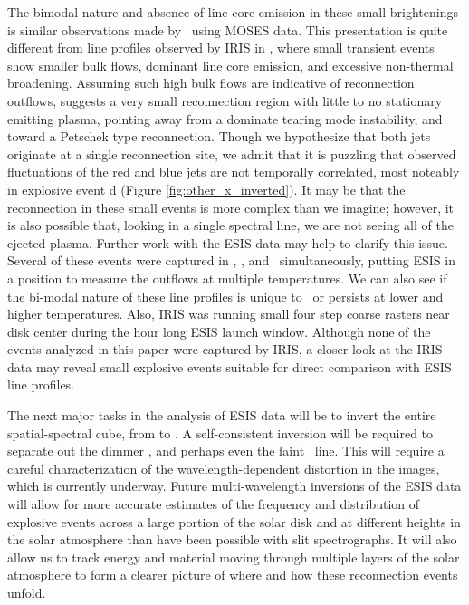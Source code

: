 	The bimodal nature and absence of line core emission in these small brightenings is similar observations made by \citet{Rust2019} \heii \ using MOSES data.
	This presentation is quite different from line profiles observed by IRIS \citep{depontieu2014} in , where small transient events show smaller bulk flows, dominant line core emission, and excessive non-thermal broadening.
	Assuming such high bulk flows are indicative of reconnection outflows, suggests a very small reconnection region with little to no stationary emitting plasma, pointing away from a dominate tearing mode instability, and toward a Petschek type reconnection.
	Though we hypothesize that both jets originate at a single reconnection site, we admit that it is puzzling that observed fluctuations of the red and blue jets are not temporally correlated, most noteably in explosive event d (Figure \ref{fig:other_x_inverted}). 
	It may be that the reconnection in these small events is more complex than we imagine; however, it is also possible that, looking in a single spectral line, we are not seeing all of the ejected plasma. 
	Further work with the ESIS data may help to clarify this issue.
	Several of these events were captured in \hei, \mgxbright, and \ov \ simultaneously, putting ESIS in a position to measure the outflows at multiple temperatures. 
	We can also see if the bi-modal nature of these line profiles is unique to \ov \ or persists at lower and higher temperatures.
	Also, IRIS was running small four step coarse rasters near disk center during the hour long ESIS launch window.
	Although none of the events analyzed in this paper were captured by IRIS, a closer look at the IRIS data may reveal small explosive events suitable for direct comparison with ESIS line profiles.
	
	The next major tasks in the analysis of ESIS data will be to invert the entire spatial-spectral cube, from  to . 
	A self-consistent inversion will be required to separate out the dimmer \mgxdim, and perhaps even the faint \oiii \ line. This will require a careful characterization of the wavelength-dependent distortion in the images, which is currently underway.
	Future multi-wavelength inversions of the ESIS data will allow for more accurate estimates of the frequency and distribution of explosive events across a large portion of the solar disk and at different heights in the solar atmosphere than have been possible with slit spectrographs.
	It will also allow us to track energy and material moving through multiple layers of the solar atmosphere to form a clearer picture of where and how these reconnection events unfold. 
	
